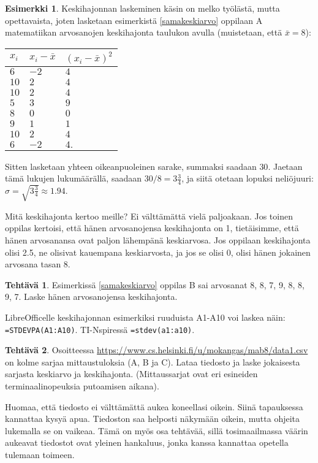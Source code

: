 \documentclass[12pt,leqno,a4paper,oneside]{amsart}
\theoremstyle{definition}
\newtheorem{example}[proclaim]{Esimerkki}
\newtheorem{exercise}{Tehtävä}
\theoremstyle{remark}
\numberwithin{equation}{section}
\begin{document}
\vspace{10pt}

\begin{example}
Keskihajonnan laskeminen käsin on melko työlästä, mutta opettavaista, joten lasketaan esimerkistä \ref{samakeskiarvo}
oppilaan A matematiikan arvosanojen keskihajonta taulukon avulla (muistetaan, että $\bar{x} = 8$):

\begin{tabular}{l|l|l}
 $x_i$ & $x_i - \bar{x}$ & $(x_i - \bar{x} )^2$ \\
 \hline
 $6$	&$-2$	&$4$\\
 $10$	&$2$	&$4$\\
 $10$	&$2$	&$4$\\
 $5$	&$3$	&$9$\\
 $8$	&$0$	&$0$\\
 $9$	&$1$	&$1$\\
 $10$	&$2$	&$4$\\
 $6$	&$-2$	&$4.$
\end{tabular}

Sitten lasketaan yhteen oikeanpuoleinen sarake, summaksi saadaan $30.$ Jaetaan tämä lukujen lukumäärällä, saadaan $30/8 = 3\frac{3}{4}$,
ja siitä otetaan lopuksi neliöjuuri: $\sigma=\sqrt{3\frac{3}{4}}\approx 1.94.$
\end{example}

Mitä keskihajonta kertoo meille? Ei välttämättä vielä paljoakaan. Jos toinen oppilas kertoisi, että hänen arvosanojensa keskihajonta on 1,
tietäisimme, että hänen arvosanansa ovat paljon lähempänä keskiarvosa. Jos oppilaan keskihajonta olisi 2.5, ne olisivat kauempana keskiarvosta,
ja jos se olisi 0, olisi hänen jokainen arvosana tasan 8.

\begin{exercise}
Esimerkissä \ref{samakeskiarvo} oppilas B sai arvosanat 8, 8, 7, 9, 8, 8, 9, 7. Laske hänen arvosanojensa keskihajonta.
\end{exercise}

LibreOfficelle keskihajonnan esimerkiksi ruuduista A1-A10 voi laskea näin: \texttt{=STDEVPA(A1:A10)}. TI-Nspiressä 
\texttt{=stdev(a1:a10)}.

\begin{exercise}
 Osoitteessa \url{https://www.cs.helsinki.fi/u/mokangas/mab8/data1.csv} on kolme sarjaa mittaustuloksia (A, B ja C). 
 Lataa tiedosto ja laske jokaisesta sarjasta keskiarvo ja keskihajonta. 
 (Mittaussarjat ovat eri esineiden terminaalinopeuksia putoamisen aikana).
 
 Huomaa, että tiedosto ei välttämättä aukea koneellasi oikein. Siinä tapauksessa kannattaa kysyä apua. Tiedoston saa helposti näkymään 
 oikein, mutta ohjeita lukemalla se on vaikeaa. Tämä on myös osa tehtävää, sillä tosimaailmassa väärin aukeavat tiedostot ovat yleinen 
 hankaluus, jonka kanssa kannattaa opetella tulemaan toimeen.
\end{exercise}
\end{document}
